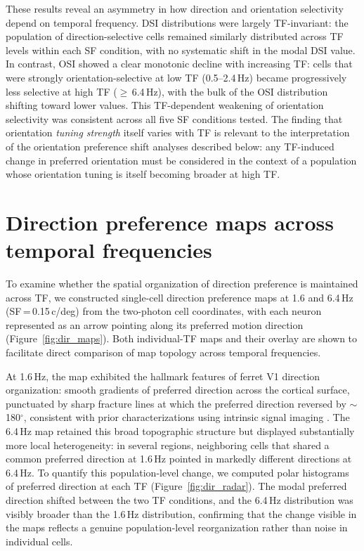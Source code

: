 \documentclass{brandeis-thesis3.3}
\begin{document}
These results reveal an asymmetry in how direction and orientation
selectivity depend on temporal frequency. DSI distributions were
largely TF-invariant: the population of direction-selective cells
remained similarly distributed across TF levels within each SF
condition, with no systematic shift in the modal DSI value. In
contrast, OSI showed a clear monotonic decline with increasing
TF: cells that were strongly orientation-selective at low TF
(0.5--2.4\,Hz) became progressively less selective at high TF
($\geq$\,6.4\,Hz), with the bulk of the OSI distribution shifting
toward lower values. This TF-dependent weakening of orientation
selectivity was consistent across all five SF conditions tested.
The finding that orientation \textit{tuning strength} itself
varies with TF is relevant to the interpretation of the
orientation preference shift analyses described below: any
TF-induced change in preferred orientation must be considered
in the context of a population whose orientation tuning is
itself becoming broader at high TF.


\section{Direction preference maps across temporal frequencies}

To examine whether the spatial organization of direction
preference is maintained across TF, we constructed single-cell
direction preference maps at 1.6 and 6.4\,Hz (SF\,=\,0.15\,c/deg)
from the two-photon cell coordinates, with each neuron
represented as an arrow pointing along its preferred motion
direction (Figure~\ref{fig:dir_maps}). Both individual-TF maps
and their overlay are shown to facilitate direct comparison of
map topology across temporal frequencies.

At 1.6\,Hz, the map exhibited the hallmark features of ferret V1
direction organization: smooth gradients of preferred direction
across the cortical surface, punctuated by sharp fracture lines
at which the preferred direction reversed by
$\sim$180$^\circ$, consistent with prior characterizations using
intrinsic signal imaging \citep{Weliky1996}. The
6.4\,Hz map retained this broad topographic structure but
displayed substantially more local heterogeneity: in several
regions, neighboring cells that shared a common preferred
direction at 1.6\,Hz pointed in markedly different directions at
6.4\,Hz. To quantify this population-level change, we computed
polar histograms of preferred direction at each TF
(Figure~\ref{fig:dir_radar}). The modal preferred direction
shifted between the two TF conditions, and the 6.4\,Hz
distribution was visibly broader than the 1.6\,Hz distribution,
confirming that the change visible in the maps reflects a genuine
population-level reorganization rather than noise in individual
cells.
\end{document}
